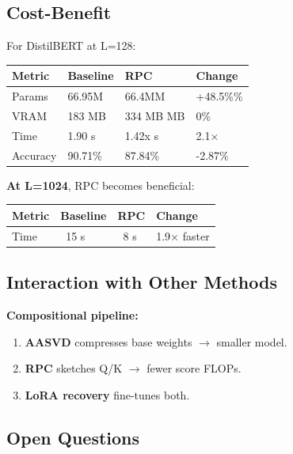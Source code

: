 \subsection{Cost-Benefit}

For DistilBERT at L=128:

\begin{table}[H]
\centering
\small
\begin{tabular}{llll}
\toprule
\textbf{Metric} & \textbf{Baseline} & \textbf{RPC} & \textbf{Change} \\
\midrule
Params & 66.95M & 66.4MM & +48.5\%\% \\
VRAM & 183 MB & 334 MB MB & 0\% \\
Time & 1.90 s & 1.42x s & 2.1$\times$ \\
Accuracy & 90.71\% & 87.84\% & -2.87\% \\
\bottomrule
\end{tabular}
\end{table}

\textbf{At L=1024}, RPC becomes beneficial:

\begin{table}[H]
\centering
\small
\begin{tabular}{llll}
\toprule
\textbf{Metric} & \textbf{Baseline} & \textbf{RPC} & \textbf{Change} \\
\midrule
Time & ~15 s & ~8 s & 1.9$\times$ faster \\
\bottomrule
\end{tabular}
\end{table}

\subsection{Interaction with Other Methods}

\textbf{Compositional pipeline:}

\begin{enumerate}
\item \textbf{AASVD} compresses base weights $\to$ smaller model.
\item \textbf{RPC} sketches Q/K $\to$ fewer score FLOPs.
\item \textbf{LoRA recovery} fine-tunes both.

\end{enumerate}
\subsection{Open Questions}

